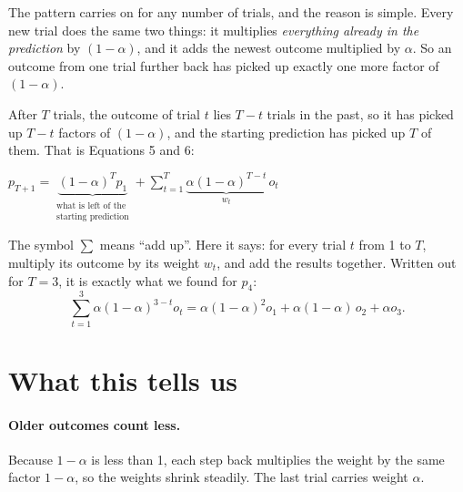 \documentclass[11pt,a4paper]{article}
\begin{document}
The pattern carries on for any number of trials, and the reason is simple. Every new trial does
the same two things: it multiplies \emph{everything already in the prediction} by $(1-\alpha)$,
and it adds the newest outcome multiplied by $\alpha$. So an outcome from one trial further back
has picked up exactly one more factor of $(1-\alpha)$.

After $T$ trials, the outcome of trial $t$ lies $T-t$ trials in the past, so it has picked up
$T-t$ factors of $(1-\alpha)$, and the starting prediction has picked up $T$ of them. That is
Equations 5 and 6:
\begin{takeaway}
\centering
$\displaystyle
  p_{T+1} = \underbrace{(1-\alpha)^T p_1}_{\substack{\textrm{what is left of the}\\
                                                    \textrm{starting prediction}}}
  + \sum^T_{t=1} \underbrace{\alpha(1-\alpha)^{T-t}}_{w_t}\, o_t$
\end{takeaway}

The symbol $\sum$ means ``add up''. Here it says: for every trial $t$ from 1 to $T$, multiply
its outcome by its weight $w_t$, and add the results together. Written out for $T = 3$, it is
exactly what we found for $p_4$:
\begin{equation*}
  \sum^3_{t=1} \alpha(1-\alpha)^{3-t} o_t
  = \alpha(1-\alpha)^2 o_1 + \alpha(1-\alpha)\, o_2 + \alpha o_3 .
\end{equation*}

\section*{What this tells us}

\paragraph{Older outcomes count less.}
Because $1-\alpha$ is less than 1, each step back multiplies the weight by the same factor
$1-\alpha$, so the weights shrink steadily. The last trial carries weight $\alpha$.
\end{document}
